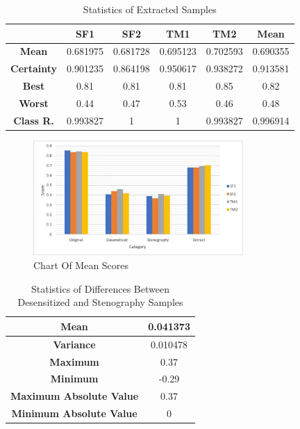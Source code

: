 \documentclass[journal]{IEEEtran} %
\begin{document}
\begin{CJK*}{UTF8}{gbsn}
\begin{table}[htbp]
    \centering
    \caption{Statistics of Extracted Samples}
    \begin{tabular}{|c|c|c|c|c|c|}
        \hline
        & \textbf{SF1} & \textbf{SF2} & \textbf{TM1} & \textbf{TM2} & \textbf{Mean} \\
        \hline
        \textbf{Mean} & 0.681975 & 0.681728 & 0.695123 & 0.702593 & 0.690355 \\
        \hline
        \textbf{Certainty} & 0.901235 & 0.864198 & 0.950617 & 0.938272 & 0.913581 \\
        \hline
        \textbf{Best} & 0.81 & 0.81 & 0.81 & 0.85 & 0.82 \\
        \hline
        \textbf{Worst} & 0.44 & 0.47 & 0.53 & 0.46 & 0.48 \\
        \hline
        \textbf{Class R.} & 0.993827 & 1 & 1 & 0.993827 & 0.996914 \\
        \hline
    \end{tabular}
    \label{tab:st_rec}
\end{table}

\begin{figure}[htbp]
    \centerline{\includegraphics[width=8cm]{chart.jpg}}
    \caption{Chart Of Mean Scores}
    \label{chart_mean}
\end{figure}

\begin{table}[htbp]
    \centering
    \caption{Statistics of Differences Between Desensitized and Stenography Samples}
    \begin{tabular}{|c|c|}
        \hline
        \textbf{Mean} & 0.041373 \\
        \hline
        \textbf{Variance} & 0.010478 \\
        \hline
        \textbf{Maximum} & 0.37 \\
        \hline
        \textbf{Minimum} & -0.29 \\
        \hline
        \textbf{Maximum Absolute Value} & 0.37 \\
        \hline
        \textbf{Minimum Absolute Value} & 0 \\
        \hline
    \end{tabular}
\end{table}


\end{CJK*}
\end{document}
